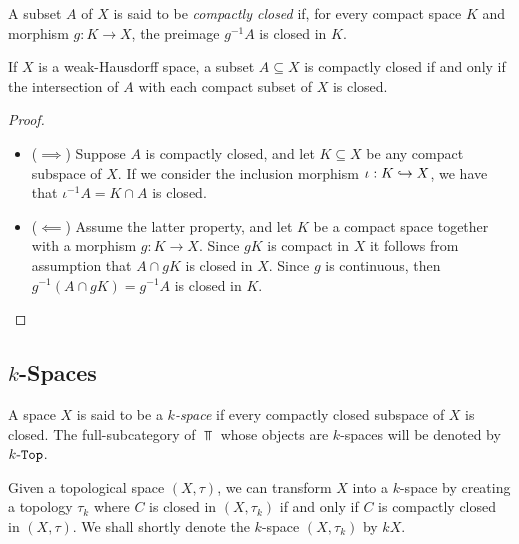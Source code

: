\begin{definition}
\label{def:compactly-closed}
A subset \(A\) of \(X\) is said to be \emph{compactly closed} if, for every
compact space \(K\) and morphism \(g: K \to X\), the preimage \(g^{-1} A\) is
closed in \(K\).
\end{definition}

\begin{proposition}
\label{prop:compactly-closed-in-weak-hausdorff-space}
If \(X\) is a weak-Hausdorff space, a subset \(A \subseteq X\) is compactly
closed if and only if the intersection of \(A\) with each compact subset of
\(X\) is closed.
\end{proposition}

\begin{proof}
\begin{itemize}\setlength\itemsep{0em}
\item (\(\implies\)) Suppose \(A\) is compactly closed, and let
  \(K \subseteq X\) be any compact subspace of \(X\). If we consider the
  inclusion morphism \(\iota: K \hookrightarrow X\), we have that
  \(\iota^{-1} A = K \cap A\) is closed.

\item (\(\impliedby\)) Assume the latter property, and let \(K\) be a compact
  space together with a morphism \(g: K \to X\). Since \(g K\) is compact in
  \(X\) it follows from assumption that \(A \cap g K\) is closed in \(X\). Since
  \(g\) is continuous, then \(g^{-1}(A \cap g K) = g^{-1} A\) is closed in
  \(K\).
\end{itemize}
\end{proof}

\subsection{\texorpdfstring{\(k\)}{k}-Spaces}

\begin{definition}[\(k\)-space]
\label{def:k-space}
A space \(X\) is said to be a \emph{\(k\)-space} if every compactly closed
subspace of \(X\) is closed. The full-subcategory of \(\Top\) whose objects are
\(k\)-spaces will be denoted by \({k\text{-}\texttt{Top}}\).
\end{definition}

\begin{lemma}[\(k\)-ification]
\label{lem:k-ification}
Given a topological space \((X, \tau)\), we can transform \(X\) into a
\(k\)-space by creating a topology \(\tau_k\) where \(C\) is closed in
\((X, \tau_k)\) if and only if \(C\) is compactly closed in \((X, \tau)\). We
shall shortly denote the \(k\)-space \((X, \tau_k)\) by \(kX\).
\end{lemma}

